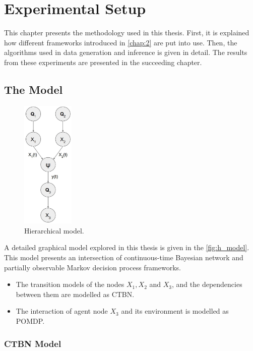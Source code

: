 
\chapter{Experimental Setup}

This chapter presents the methodology used in this thesis. First, it is explained how different frameworks introduced in \autoref{chap:2} are put into use. Then, the algorithms used in data generation and inference is given in detail. The results from these experiments are presented in the succeeding chapter.

\section{The Model}
\begin{figure}
	\begin{center}
		\includegraphics[width=2.5cm]{figures/h_model}
		\caption{Hierarchical model.}
	\end{center}
	\label{fig:h_model}
\end{figure} 
A detailed graphical model explored in this thesis is given in the \autoref{fig:h_model}. This model presents an intersection of continuous-time Bayesian network and partially observable Markov decision process frameworks. 
\begin{itemize}
	\item The transition models of the nodes $ X_1, X_2$ and $ X_3 $, and the dependencies between them are modelled as CTBN.
	\item The interaction of agent node $ X_3 $ and its environment is modelled as POMDP.
\end{itemize}

\subsection{CTBN Model}

